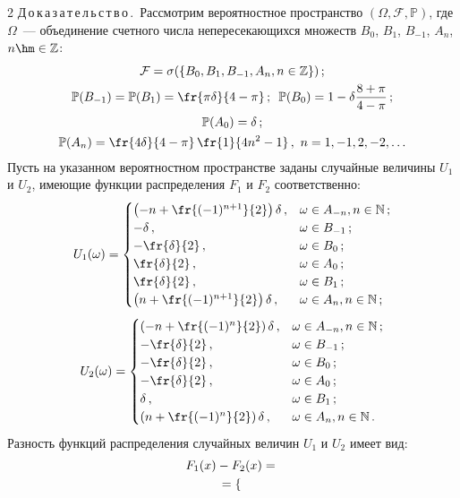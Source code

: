 \begin{multicols}{2}
\noindent
Д\,о\,к\,а\,з\,а\,т\,е\,л\,ь\,с\,т\,в\,о\,.\ 
Рассмотрим вероятностное пространство
$(\Omega,\mathcal{F},\mathbb{P})$, где $\Omega$~--- объединение
счетного числа непересекающихся множеств $B_0$, $B_1$, $B_{-1}$,
$A_n$, $n\hm\in\mathbb{Z}$:
\begin{gather*}
\mathcal{F} = \sigma(\{B_0, B_1, B_{-1}, A_n, n\in\mathbb{Z}\})\,;
\\
\mathbb{P}(B_{-1}) = \mathbb{P}(B_{ 1}) = \fr{ \pi \delta}{4-\pi}\,; \enskip
\mathbb{P}(B_{0}) = 1- \delta \frac{8 + \pi}{4 - \pi} \,;
\\
\mathbb{P}(A_{0}) =  \delta\,;\\
\mathbb{P}(A_{n}) = \fr{4 \delta
}{4-\pi} \,\fr{1}{4n^2 - 1 }\,,  \ n = 1, -1,  2, -2, \ldots
\end{gather*}
Пусть на указанном вероятностном пространстве заданы случайные
величины $U_1$ и $U_2$, имеющие функции распределения $F_1$ и $F_2$
соответственно:
$$
U_1(\omega)=
\begin{cases}
    \left(-n+\fr{(-1)^{n+1}}{2}\right)\delta\,,     & \omega\in A_{-n}, n\in\mathbb{N}\,;\\
    -\delta\,,            & \omega\in B_{-1}\,;\\
    -\fr{\delta}{2}\,,  & \omega\in B_0\,;\\
    \fr{\delta}{2}\,,  & \omega\in A_0\,;\\
    \fr{\delta}{2}\,,   & \omega\in B_1\,;\\
    \left(n+\fr{(-1)^{n+1}}{2}\right)\delta\,,      & \omega\in A_n, n\in\mathbb{N}\,;
\end{cases}
$$
$$
U_2(\omega)=
\begin{cases}
    \left(-n+\fr{(-1)^{n}}{2}\right)\delta\,,     & \omega\in A_{-n}, n\in\mathbb{N}\,;\\
    -\fr{\delta}{2}\,,            & \omega\in B_{-1}\,;\\
    -\fr{\delta}{2}\,,  & \omega\in B_0\,;\\
    -\fr{\delta}{2}\,,  & \omega\in A_0\,;\\
    \delta\,,   & \omega\in B_1\,;\\
    \left(n+\fr{(-1)^{n}}{2}\right)\delta\,,      & \omega\in A_n, n\in\mathbb{N}\,.
\end{cases}
$$
Разность функций распределения случайных величин $U_1$ и  $U_2$ имеет вид:
\begin{multline*}
F_1(x) - F_2(x)={}\\
\hspace*{-1mm}{}=
\begin{cases}

\end{cases}
\end{multline*}
\end{multicols}
